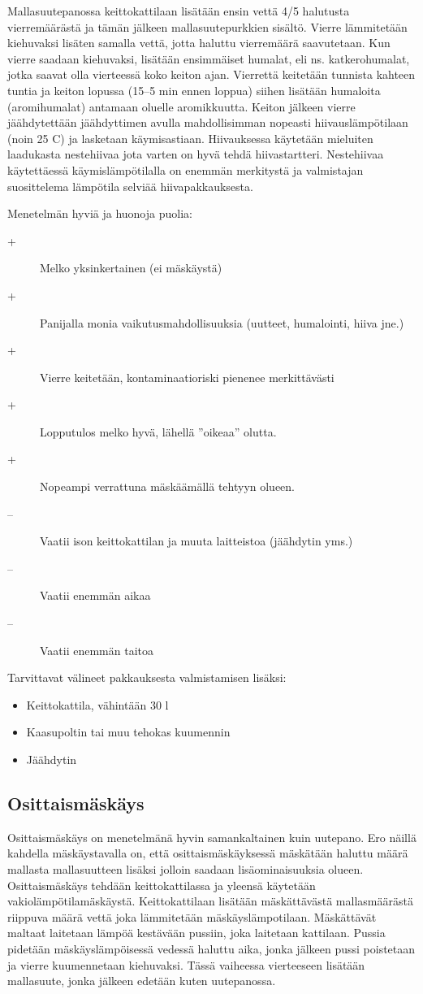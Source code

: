 \documentclass[a4paper,11pt]{report}
\begin{document}
Mallasuutepanossa keittokattilaan lisätään ensin vettä 4/5 halutusta vierremäärästä ja tämän jälkeen mallasuutepurkkien sisältö. Vierre lämmitetään kiehuvaksi lisäten samalla vettä, jotta haluttu vierremäärä saavutetaan. Kun vierre saadaan kiehuvaksi, lisätään ensimmäiset humalat, eli ns. katkerohumalat, jotka saavat olla vierteessä koko keiton ajan. Vierrettä keitetään tunnista kahteen tuntia ja keiton lopussa (15--5 min ennen loppua) siihen lisätään humaloita (aromihumalat) antamaan oluelle aromikkuutta. Keiton jälkeen vierre jäähdytettään jäähdyttimen avulla mahdollisimman nopeasti hiivauslämpötilaan (noin 25 \degree C) ja lasketaan käymisastiaan. Hiivauksessa käytetään mieluiten laadukasta nestehiivaa jota varten on hyvä tehdä hiivastartteri. Nestehiivaa käytettäessä käymislämpötilalla on enemmän merkitystä ja valmistajan suosittelema lämpötila selviää hiivapakkauksesta.

Menetelmän hyviä ja huonoja puolia:
\begin{description}
\item[+] Melko yksinkertainen (ei mäskäystä)
\item[+] Panijalla monia vaikutusmahdollisuuksia (uutteet, humalointi, hiiva jne.) 
\item[+] Vierre keitetään, kontaminaatioriski pienenee merkittävästi 
\item[+] Lopputulos melko hyvä, lähellä ''oikeaa'' olutta.
\item[+] Nopeampi verrattuna mäskäämällä tehtyyn olueen.
\item[--] Vaatii ison keittokattilan ja muuta laitteistoa (jäähdytin yms.)
\item[--] Vaatii enemmän aikaa
\item[--] Vaatii enemmän taitoa
\end{description}
Tarvittavat välineet pakkauksesta valmistamisen lisäksi:
\begin{itemize}
\item Keittokattila, vähintään 30 l
\item Kaasupoltin tai muu tehokas kuumennin
\item Jäähdytin
\end{itemize}

\subsection{Osittaismäskäys}

Osittaismäskäys on menetelmänä hyvin samankaltainen kuin uutepano. Ero näillä kahdella mäskäystavalla on, että osittaismäskäyksessä mäskätään haluttu määrä mallasta mallasuutteen lisäksi jolloin saadaan lisäominaisuuksia olueen. Osittaismäskäys tehdään keittokattilassa ja yleensä käytetään vakiolämpötilamäskäystä. Keittokattilaan lisätään mäskättävästä mallasmäärästä riippuva määrä vettä joka lämmitetään mäskäyslämpotilaan. Mäskättävät maltaat laitetaan lämpöä kestävään pussiin, joka laitetaan kattilaan. Pussia pidetään mäskäyslämpöisessä vedessä haluttu aika, jonka jälkeen pussi poistetaan ja vierre kuumennetaan kiehuvaksi. Tässä vaiheessa vierteeseen lisätään mallasuute, jonka jälkeen edetään kuten uutepanossa.
\end{document}
